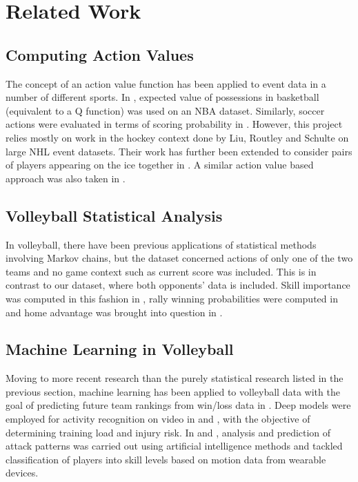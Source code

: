 \documentclass{sfuthesis}
\begin{document}
	\section{Related Work}
	\subsection{Computing Action Values}
	The concept of an action value function has been applied to event data in a number of different sports. In \cite{cervone2014pointwise}, expected value of possessions in basketball (equivalent to a Q function) was used on an NBA dataset. Similarly, soccer actions were evaluated in terms of scoring probability in \cite{decroos2019actions}. However, this project relies mostly on work in the hockey context done by Liu, Routley and Schulte \cite{liu2018deep, routley2015markov, schulte2017markov, schulte2017apples} on large NHL event datasets. Their work has further been extended to consider pairs of players appearing on the ice together in \cite{Ljung2019}. A similar action value based approach was also taken in \cite{kaplan2014markov}.
	\subsection{Volleyball Statistical Analysis}
	In volleyball, there have been previous applications of statistical methods involving Markov chains, but the dataset concerned actions of only one of the two teams and no game context such as current score was included. This is in contrast to our dataset, where both opponents' data is included. Skill importance was computed in this fashion in \cite{miskin2010skill}, rally winning probabilities were computed in \cite{florence2008skill} and home advantage was brought into question in \cite{alexandros2012existence}.
	\subsection{Machine Learning in Volleyball}
	Moving to more recent research than the purely statistical research listed in the previous section, machine learning has been applied to volleyball data with the goal of predicting future team rankings from win/loss data in \cite{tumer2017prediction}.  Deep models were employed for activity recognition on video in \cite{ibrahim2018deep} and \cite{kautz2017activity}, with the objective of determining training load and injury risk. In \cite{wenninger2020performance} and \cite{van2016analyzing}, analysis and prediction of attack patterns was carried out using artificial intelligence methods and \cite{wang2018volleyball} tackled classification of players into skill levels based on motion data from wearable devices.
	
\end{document}
